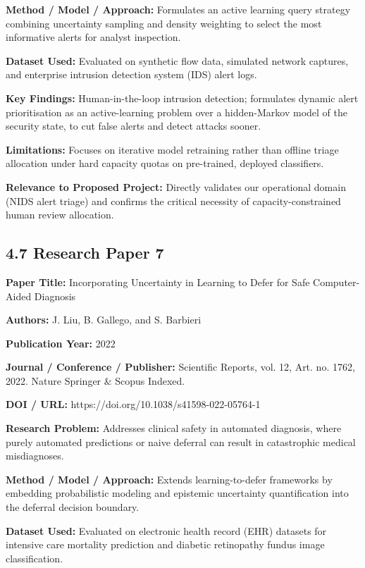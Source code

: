 \textbf{Method / Model / Approach:} Formulates an active learning query strategy combining uncertainty sampling and density weighting to select the most informative alerts for analyst inspection.

\textbf{Dataset Used:} Evaluated on synthetic flow data, simulated network captures, and enterprise intrusion detection system (IDS) alert logs.

\textbf{Key Findings:} Human-in-the-loop intrusion detection; formulates dynamic alert prioritisation as an active-learning problem over a hidden-Markov model of the security state, to cut false alerts and detect attacks sooner.

\textbf{Limitations:} Focuses on iterative model retraining rather than offline triage allocation under hard capacity quotas on pre-trained, deployed classifiers.

\textbf{Relevance to Proposed Project:} Directly validates our operational domain (NIDS alert triage) and confirms the critical necessity of capacity-constrained human review allocation.

\subsection{4.7 Research Paper 7}

\textbf{Paper Title:} Incorporating Uncertainty in Learning to Defer for Safe Computer-Aided Diagnosis

\textbf{Authors:} J. Liu, B. Gallego, and S. Barbieri

\textbf{Publication Year:} 2022

\textbf{Journal / Conference / Publisher:} Scientific Reports, vol. 12, Art. no. 1762, 2022. Nature Springer \& Scopus Indexed.

\textbf{DOI / URL:} https://doi.org/10.1038/s41598-022-05764-1

\textbf{Research Problem:} Addresses clinical safety in automated diagnosis, where purely automated predictions or naive deferral can result in catastrophic medical misdiagnoses.

\textbf{Method / Model / Approach:} Extends learning-to-defer frameworks by embedding probabilistic modeling and epistemic uncertainty quantification into the deferral decision boundary.

\textbf{Dataset Used:} Evaluated on electronic health record (EHR) datasets for intensive care mortality prediction and diabetic retinopathy fundus image classification.

